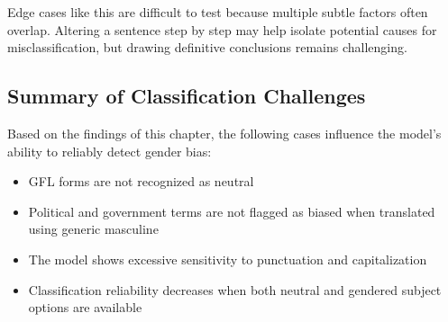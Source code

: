     Edge cases like this are difficult to test because multiple subtle factors often overlap. Altering a sentence step by step may help isolate potential causes for misclassification, but drawing definitive conclusions remains challenging.

    \subsection{Summary of Classification Challenges}
    Based on the findings of this chapter, the following cases influence the model's ability to reliably detect gender bias:

    \begin{itemize}
        \item GFL forms are not recognized as neutral
        \item Political and government terms are not flagged as biased when translated using generic masculine
        \item The model shows excessive sensitivity to punctuation and capitalization
        \item Classification reliability decreases when both neutral and gendered subject options are available
    \end{itemize}

 